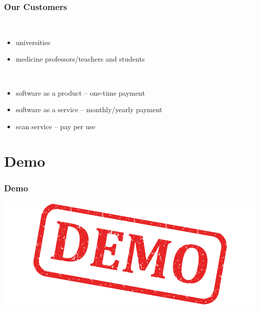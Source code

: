 \begin{frame}
  \frametitle{Our Customers}
      \begin{description}[]
        \item[Profile] \hfill \\
        \begin{itemize}
          \item universities
          \item medicine professors/teachers and students
        \end{itemize}

        \bigskip
        \item[Cost plan] \hfill \\
          \begin{itemize}
            \item software as a product -- one-time payment
            \item software as a service -- monthly/yearly payment
            \item scan service -- pay per use
        \end{itemize}
      \end{description}

\end{frame}


\section{Demo}

\begin{frame}
  \frametitle{Demo}
  \includegraphics[width=\textwidth]{images/demo}
\end{frame}



